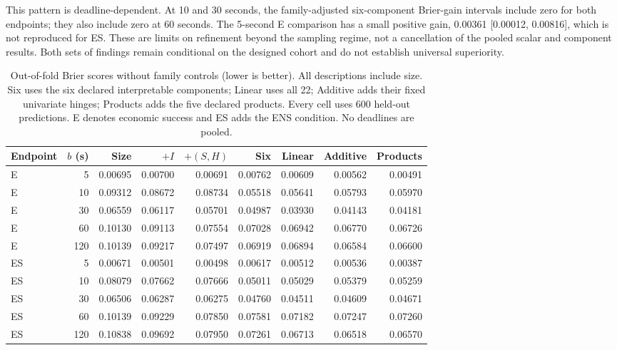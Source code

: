 This pattern is deadline-dependent. At 10 and 30 seconds, the
family-adjusted six-component Brier-gain intervals include zero for
both endpoints; they also include zero at 60 seconds. The 5-second E
comparison has a small positive gain, 0.00361 [0.00012, 0.00816],
which is not reproduced for ES. These are limits on refinement beyond
the sampling regime, not a cancellation of the pooled scalar and
component results. Both sets of findings remain conditional on the
designed cohort and do not establish universal superiority.

\begin{table}[htbp]\centering\small
\setlength{\tabcolsep}{3.5pt}
\begin{tabular}{lrrrrrrrr}\toprule
Endpoint & $b$ (s) & Size & $+I$ & $+(S,H)$ & Six & Linear & Additive & Products\\\midrule
E & 5 & 0.00695 & 0.00700 & 0.00691 & 0.00762 & 0.00609 & 0.00562 & 0.00491 \\
E & 10 & 0.09312 & 0.08672 & 0.08734 & 0.05518 & 0.05641 & 0.05793 & 0.05970 \\
E & 30 & 0.06559 & 0.06117 & 0.05701 & 0.04987 & 0.03930 & 0.04143 & 0.04181 \\
E & 60 & 0.10130 & 0.09113 & 0.07554 & 0.07028 & 0.06942 & 0.06770 & 0.06726 \\
E & 120 & 0.10139 & 0.09217 & 0.07497 & 0.06919 & 0.06894 & 0.06584 & 0.06600 \\
\midrule
ES & 5 & 0.00671 & 0.00501 & 0.00498 & 0.00617 & 0.00512 & 0.00536 & 0.00387 \\
ES & 10 & 0.08079 & 0.07662 & 0.07666 & 0.05011 & 0.05029 & 0.05379 & 0.05259 \\
ES & 30 & 0.06506 & 0.06287 & 0.06275 & 0.04760 & 0.04511 & 0.04609 & 0.04671 \\
ES & 60 & 0.10139 & 0.09229 & 0.07850 & 0.07581 & 0.07182 & 0.07247 & 0.07260 \\
ES & 120 & 0.10838 & 0.09692 & 0.07950 & 0.07261 & 0.06713 & 0.06518 & 0.06570 \\
\bottomrule\end{tabular}
\caption{Out-of-fold Brier scores without family controls (lower is better). All descriptions include size. Six uses the six declared interpretable components; Linear uses all 22; Additive adds their fixed univariate hinges; Products adds the five declared products. Every cell uses 600 held-out predictions. E denotes economic success and ES adds the ENS condition. No deadlines are pooled.}
\label{tab:p1_brier_nofamily}
\end{table}

